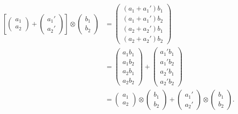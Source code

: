 \documentclass[prx,12pt]{revtex4-2}
\begin{document}
\begin{align}
  \left[\begin{pmatrix} a_1 \\ a_2 \end{pmatrix}
    + \begin{pmatrix} a_1' \\ a_2' \end{pmatrix} \right]
  \otimes \begin{pmatrix} b_1 \\ b_2 \end{pmatrix}
  &=
  \begin{pmatrix} (a_1+a_1') b_1 \\ (a_1+a_1') b_2 \\
    (a_2+a_2') b_1 \\ (a_2+a_2') b_2 \end{pmatrix} \\
  &=
  \begin{pmatrix} a_1 b_1 \\ a_1 b_2 \\ a_2 b_1 \\ a_2 b_2 \end{pmatrix}
  + \begin{pmatrix} a_1' b_1 \\ a_1' b_2 \\ a_2' b_1 \\ a_2' b_2 \end{pmatrix}\\
  &= \begin{pmatrix} a_1 \\ a_2 \end{pmatrix} \otimes
  \begin{pmatrix} b_1 \\ b_2 \end{pmatrix}
  + \begin{pmatrix} a_1' \\ a_2' \end{pmatrix} \otimes
  \begin{pmatrix} b_1 \\ b_2 \end{pmatrix}.
\end{align}
\end{document}

